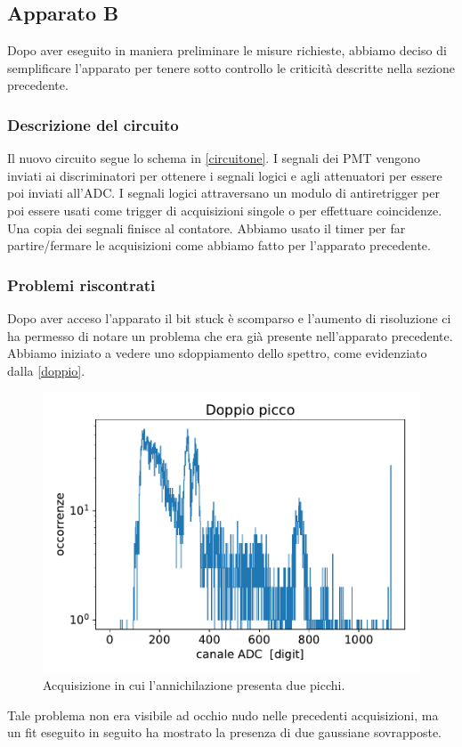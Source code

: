 \subsection{Apparato B}

Dopo aver eseguito in maniera preliminare le misure richieste, abbiamo deciso di semplificare l'apparato per tenere sotto controllo le criticità descritte nella sezione precedente.

\subsubsection{Descrizione del circuito}

Il nuovo circuito segue lo schema in \autoref{circuitone}.
I segnali dei PMT vengono inviati ai discriminatori per ottenere i segnali logici e agli attenuatori per essere poi inviati all'ADC. I segnali logici attraversano un modulo di antiretrigger per poi essere usati come trigger di acquisizioni singole o per effettuare coincidenze. Una copia dei segnali finisce al contatore. Abbiamo usato il timer per far partire/fermare le acquisizioni come abbiamo fatto per l'apparato precedente.

\subsubsection{Problemi riscontrati}
\label{ref}
Dopo aver acceso l'apparato il bit stuck è scomparso e l'aumento di risoluzione ci ha permesso di notare un problema che era già presente nell'apparato precedente. Abbiamo iniziato a vedere uno sdoppiamento dello spettro, come evidenziato dalla \autoref{doppio}. 

\begin{figure}[h]
\centering
\includegraphics[width=20 em]{immagini/doppio}
\caption{Acquisizione in cui l'annichilazione presenta due picchi.}
\label{doppio}
\end{figure}

Tale problema non era visibile ad occhio nudo nelle precedenti acquisizioni, ma un fit eseguito in seguito ha mostrato la presenza di due gaussiane sovrapposte.

